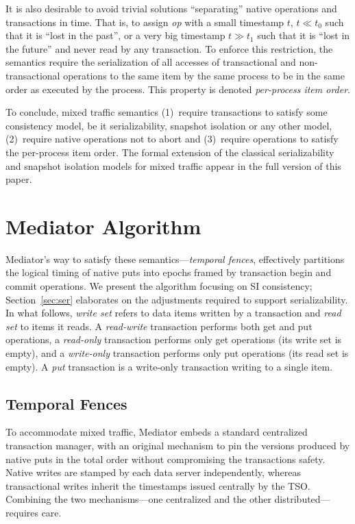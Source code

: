 It is also desirable to avoid trivial solutions ``separating'' native
operations and transactions in time. That is, to assign \emph{op} with a 
small timestamp $t$, $t \ll t_0$ such that it is ``lost in the past'', or a very
big timestamp $t \gg t_1$ such that it is ``lost in the future'' and never read
by any transaction. To enforce this restriction, the semantics require the
serialization of all accesses of transactional and non-transactional operations to the same
item by the same process to be in the same order as executed by the process. 
This property is denoted \emph{per-process item order}.

To conclude, mixed traffic semantics (1)~require transactions to satisfy some
consistency model, be it serializability, snapshot isolation or any other
model, (2)~require native operations not to abort and (3)~require
operations to satisfy the per-process item order. The formal extension of the
classical serializability and snapshot isolation models for mixed traffic
appear in the full version of this paper.

\section{Mediator Algorithm}
\label{sec:algorithm}

Mediator's way to satisfy these semantics---\emph{temporal fences},
effectively partitions the logical timing of native puts into epochs framed by transaction begin and
commit operations.  
%
We present the algorithm focusing on SI
consistency; Section~\ref{sec:ser} elaborates on the adjustments 
required to support serializability.  In what follows, \emph{write set} refers
to data items written by a transaction and \emph{read set} to items it reads. 
A \emph{read-write} transaction performs both get and put operations,
a \emph{read-only} transaction performs only get operations (its write set is
 empty), and a \emph{write-only} transaction performs only put operations (its
 read set is empty). A \emph{put} transaction is a write-only transaction
 writing to a single item.


\subsection{Temporal Fences}
\label{sec:temporal fences}

To accommodate mixed traffic, Mediator embeds 
a standard centralized transaction manager, with an original mechanism to pin 
the versions produced by native puts in the total order without compromising
the transactions safety. %
Native writes are stamped by each data server independently, whereas
transactional writes inherit the timestamps issued centrally by the TSO.
Combining the two mechanisms---one centralized and the other
distributed---requires care.

